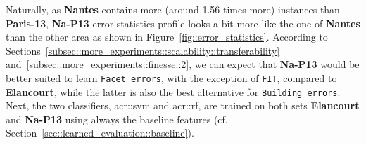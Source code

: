        \begin{figure}[htpb]
            \centering
        \end{figure}

        Naturally, as \textbf{Nantes} contains more (around 1.56 times more) instances than \textbf{Paris-13}, \textbf{Na-P13} error statistics profile looks a bit more like the one of \textbf{Nantes} than the other area as shown in Figure~\ref{fig::error_statistics}.
        According to Sections~\ref{subsec::more_experiments::scalability::transferability} and~\ref{subsec::more_experiments::finesse::2}, we can expect that \textbf{Na-P13} would be better suited to learn \texttt{Facet errors}, with the exception of \texttt{FIT}, compared to \textbf{Elancourt}, while the latter is also the best alternative for \texttt{Building errors}.
        Next, the two classifiers, \gls{acr::svm} and \gls{acr::rf}, are trained on both sets \textbf{Elancourt} and \textbf{Na-P13} using always the baseline features (cf. Section~\ref{sec::learned_evaluation::baseline}).

